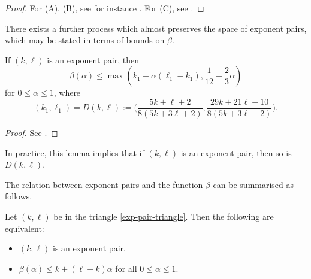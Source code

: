 \documentclass[a4paper, 10pt]{amsart}
\begin{document}
\begin{proof} For (A), (B), see for instance \cite[Lemmas 2.8, 2.9]{ivic}.  For (C), see \cite[Theorem 5]{sargos_analog_2003}. 
\end{proof}

There exists a further process which almost preserves the space of exponent pairs, which may be stated in terms of bounds on $\beta$. 

\begin{lemma}\label{D-process} If $(k, \ell)$ is an exponent pair, then $$\beta(\alpha) \le \max\left(k_1 + \alpha(\ell_1 - k_1), \frac{1}{12} + \frac{2}{3}\alpha\right)$$ for $0\le \alpha \le 1$, where 
\[
(k_1, \ell_1) = D(k, \ell) := \Big(\frac{5k+\ell+2}{8(5k+3\ell+2)}, \frac{29k+21\ell+10}{8(5k+3\ell+2)}\Big).
\]
\end{lemma}
\begin{proof}
See \cite[Theorem 7.1]{sargos_points_1995}.
\end{proof}

In practice, this lemma  implies that if $(k, \ell)$ is an exponent pair, then so is $D(k, \ell)$. 

The relation between exponent pairs and the function $\beta$ can be summarised as follows.

\begin{lemma}\label{beta-duality}  Let $(k,\ell)$ be in the triangle \eqref{exp-pair-triangle}.  Then the following are equivalent:
    \begin{itemize}
    \item[(i)] $(k,\ell)$ is an exponent pair.
    \item[(ii)] $\beta(\alpha) \leq k + (\ell-k)\alpha$ for all $0 \leq \alpha \leq 1$.
    \end{itemize}
\end{lemma}
\end{document}
